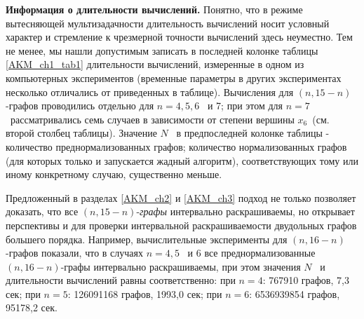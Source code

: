 
\textbf{Информация о длительности вычислений. }Понятно, что в режиме вытесняющей мультизадачности длительность
вычислений носит условный характер и стремление к чрезмерной точности вычислений здесь неуместно. Тем не менее, мы
нашли допустимым записать в последней колонке таблицы \ref{AKM_ch1_tab1} длительности вычислений, измеренные в одном из компьютерных
экспериментов (временные параметры в других экспериментах несколько отличались от приведенных в таблице). Вычисления
для  $(n,15-n)${}-графов проводились отдельно для  $n=4,5,6$ \ и 7; при этом для  $n=7$ \ рассматривались семь случаев
в зависимости от степени вершины  $x_6$\ (см. второй столбец таблицы). Значение  $N$ \ в предпоследней колонке таблицы
- количество преднормализованных графов; количество нормализованных графов (для которых только и запускается жадный
алгоритм), соответствующих тому или иному конкретному случаю, существенно меньше.

Предложенный в разделах \ref{AKM_ch2} и \ref{AKM_ch3} подход не только позволяет доказать, что все
$(n,15-n)${}-\textit{графы }интервально раскрашиваемы, но открывает перспективы и для проверки интервальной
раскрашиваемости двудольных графов большего порядка. Например, вычислительные эксперименты для  $(n,16-n)${}-графов
показали, что в случаях  $n=4,5$ \ и 6 все преднормализованные  $(n,16-n)${}-графы интервально раскрашиваемы, при этом
значения  $N$ \ и длительности вычислений равны соответственно: при  $n=4$: 767910 графов, 7,3 сек; при  $n=5$:
126091168 графов, 1993,0 сек; при  $n=6$: 6536939854 графов, 95178,2 сек.

